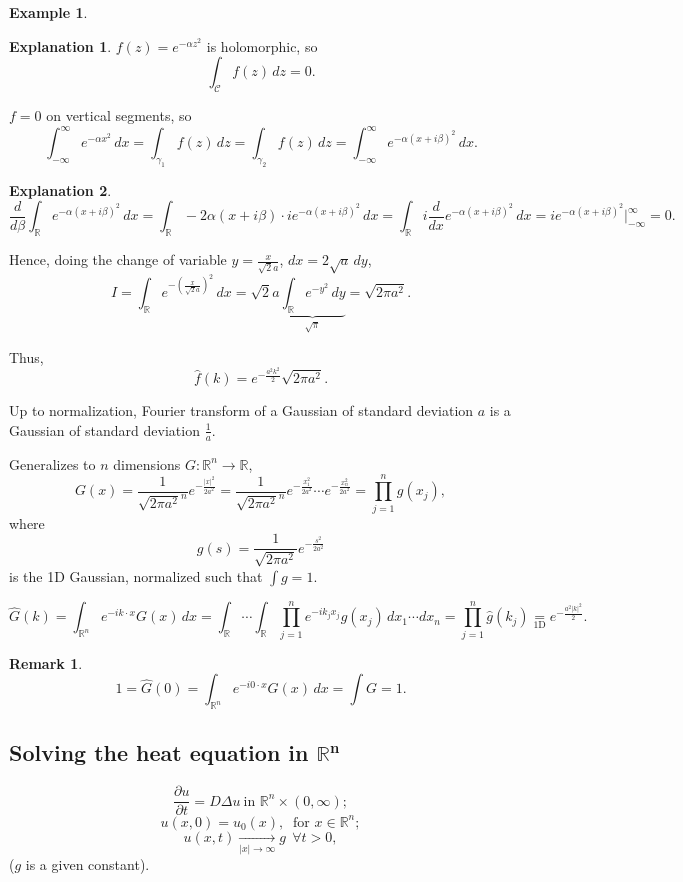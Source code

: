 \documentclass[12pt]{article}
\theoremstyle{definition}
\newtheorem*{remark}{Remark}
\newtheorem{explanation}{Explanation}
\newtheorem*{example*}{Example}
\begin{document}
\begin{example*}
\begin{explanation}
$f(z)=e^{-\alpha z^2}$ is holomorphic, so
\[\int_{\mathcal{C}}f(z)\,dz=0.\]

$f=0$ on vertical segments, so
\[\int_{-\infty}^{\infty}e^{-\alpha x^2}\,dx=\int_{\gamma_1}f(z)\,dz=\int_{\gamma_2}f(z)\,dz=\int_{-\infty}^{\infty}e^{-\alpha(x+i\beta)^2}\,dx.\]
\end{explanation}

\begin{explanation}
\[\frac{d}{d\beta}\int_{\mathbb{R}}e^{-\alpha(x+i\beta)^2}\,dx=\int_{\mathbb{R}}-2\alpha(x+i\beta)\cdot ie^{-\alpha(x+i\beta)^2}\,dx=\int_{\mathbb{R}}i\frac{d}{dx}e^{-\alpha(x+i\beta)^2}\,dx=ie^{-\alpha(x+i\beta)^2}\Big|_{-\infty}^{\infty}=0.\]

Hence, doing the change of variable $y=\frac{x}{\sqrt{2}a}$, $dx=2\sqrt{a}\,dy$,
\[I=\int_{\mathbb{R}}e^{-\left(\frac{x}{\sqrt{2}a}\right)^2}\,dx=\sqrt{2}a\underbrace{\int_{\mathbb{R}}e^{-y^2}\,dy}_{\sqrt{\pi}}=\sqrt{2\pi a^2}.\]

Thus,
\[\hat{f}(k)=e^{-\frac{a^2k^2}{2}}\sqrt{2\pi a^2}.\]
\end{explanation}

Up to normalization, Fourier transform of a Gaussian of standard deviation $a$ is a Gaussian of standard deviation $\frac{1}{a}$.

Generalizes to $n$ dimensions $G:\mathbb{R}^n\rightarrow\mathbb{R}$,
\[G(x)=\frac{1}{\sqrt{2\pi a^2}^n}e^{-\frac{|x|^2}{2a^2}}=\frac{1}{\sqrt{2\pi a^2}^n}e^{-\frac{x_1^2}{2a^2}}\cdots e^{-\frac{x_n^2}{2a^2}}=\prod_{j=1}^ng(x_j),\]
where
\[g(s)=\frac{1}{\sqrt{2\pi a^2}}e^{-\frac{s^2}{2a^2}}\]
is the 1D Gaussian, normalized such that $\int g=1$.

\[\widehat{G}(k)=\int_{\mathbb{R}^n}e^{-ik\cdot x}G(x)\,dx=\int_{\mathbb{R}}\cdots\int_{\mathbb{R}}\prod_{j=1}^ne^{-ik_jx_j}g(x_j)\,dx_1\cdots dx_n=\prod_{j=1}^n\hat{g}(k_j)\underset{\text{1D}}{=}e^{-\frac{a^2|k|^2}{2}}.\]

\begin{remark}
\[1=\widehat{G}(0)=\int_{\mathbb{R}^n}e^{-i0\cdot x}G(x)\,dx=\int G=1.\]
\end{remark}
\end{example*}

\subsection[Solving the heat equation in \texorpdfstring{$\mathbb{R}^n$}{R\^{}n}]{Solving the heat equation in \texorpdfstring{$\boldsymbol{\mathbb{R}^n}$}{R\^{}n}}
\begin{equation}\tag{H}\label{heat_eq}
\frac{\partial u}{\partial t}=D\Delta u\ \text{
in }\mathbb{R}^n\times(0,\infty);
\end{equation}
\begin{equation}\tag{IC}\label{ini_con_heat}
u(x,0)=u_0(x),\ \text{ for }x\in\mathbb{R}^n;
\end{equation}
\begin{equation}\tag{BC}\label{boun_con_heat}
u(x,t)\xrightarrow[|x|\to\infty]{}g\ \ \forall t>0,
\end{equation}
($g$ is a given constant).
\end{document}
